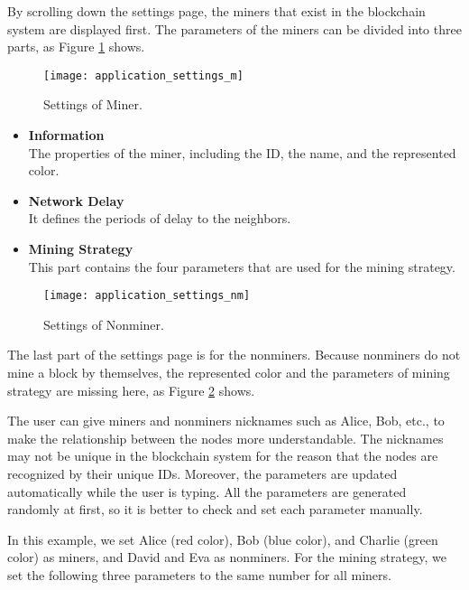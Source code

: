 By scrolling down the settings page, the miners that exist in the blockchain system are displayed first. The parameters of the miners can be divided into three parts, as Figure \ref{fig:settings of miner} shows.

\begin{figure}[htb]
    \centering
    \texttt{[image: application\_settings\_m]}
    \caption{Settings of Miner.}
    \label{fig:settings of miner}
\end{figure}

\begin{itemize}
    \item \textbf{Information} \\
        The properties of the miner, including the ID, the name, and the represented color.
    \item \textbf{Network Delay} \\
        It defines the periods of delay to the neighbors.
    \item \textbf{Mining Strategy} \\
        This part contains the four parameters that are used for the mining strategy.
\end{itemize}

\begin{figure}[htb]
    \centering
    \texttt{[image: application\_settings\_nm]}
    \caption{Settings of Nonminer.}
    \label{fig:settings of nonminer}
\end{figure}

The last part of the settings page is for the nonminers. Because nonminers do not mine a block by themselves, the represented color and the parameters of mining strategy are missing here, as Figure \ref{fig:settings of nonminer} shows.

The user can give miners and nonminers nicknames such as Alice, Bob, etc., to make the relationship between the nodes more understandable. The nicknames may not be unique in the blockchain system for the reason that the nodes are recognized by their unique IDs. Moreover, the parameters are updated automatically while the user is typing. All the parameters are generated randomly at first, so it is better to check and set each parameter manually.

In this example, we set Alice (red color), Bob (blue color), and Charlie (green color) as miners, and David and Eva as nonminers. For the mining strategy, we set the following three parameters to the same number for all miners.

